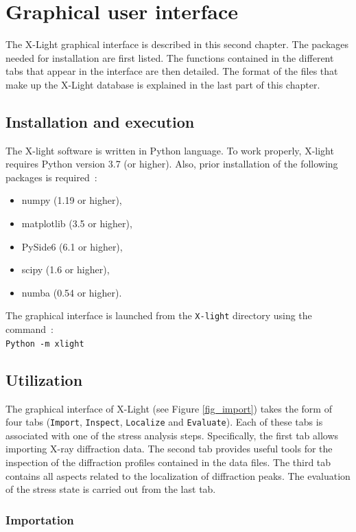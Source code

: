 \documentclass[french,a4paper]{report}
\begin{document}
\chapter{Graphical user interface}

The X-Light graphical interface is described in this second chapter. The packages needed for installation are first listed. The functions contained in the different tabs that appear in the interface are then detailed. The format of the files that make up the X-Light database is explained in the last part of this chapter.


\section{Installation and execution}

The X-light software is written in Python language. To work properly, X-light requires Python version 3.7 (or higher). Also, prior installation of the following packages is required~:
\begin{itemize}
\item{numpy (1.19 or higher),}
\item{matplotlib (3.5 or higher),}
\item{PySide6 (6.1 or higher),}
\item{scipy (1.6 or higher),}
\item{numba (0.54 or higher).}
\end{itemize}
The graphical interface is launched from the \texttt{X-light} directory using the command~:\\ 
\texttt{Python -m xlight}

\section{Utilization}

The graphical interface of X-Light (see Figure \ref{fig_import}) takes the form of four tabs (\texttt{Import}, \texttt{Inspect}, \texttt{Localize} and \texttt{Evaluate}). Each of these tabs is associated with one of the stress analysis steps. Specifically, the first tab allows importing X-ray diffraction data. The second tab provides useful tools for the inspection of the diffraction profiles contained in the data files. The third tab contains all aspects related to the localization of diffraction peaks. The evaluation of the stress state is carried out from the last tab.


\subsection{Importation}
\end{document}
